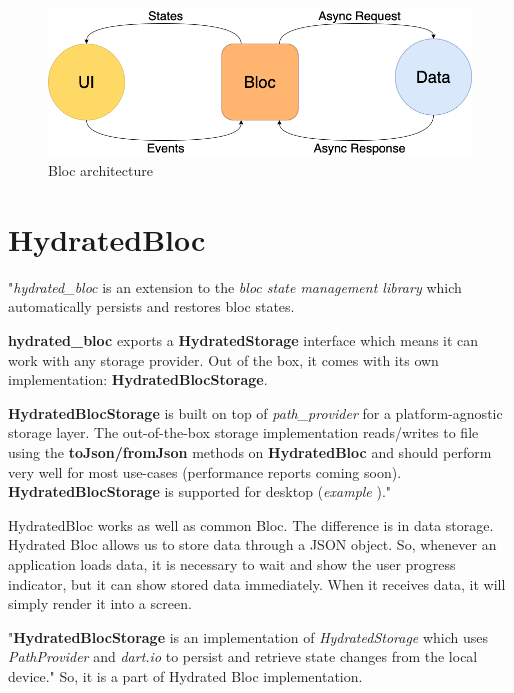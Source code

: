 \begin{figure}
    \centering
    \includegraphics[scale=0.4]{assets/bloc_architecture.png}
    \caption{Bloc architecture\cite{bloc}}
    \label{fig:bloc-architecture}
\end{figure}

\section{HydratedBloc}\label{subsec:hydratedbloc}
"\textit{hydrated\_bloc} \cite{hydratedBlocPubDev} is an extension to the \textit{bloc state management library} \cite{bloc} which automatically persists and restores bloc states.

\textbf{hydrated\_bloc} exports a \textbf{HydratedStorage} interface which means it can work with any storage provider.
Out of the box, it comes with its own implementation: \textbf{HydratedBlocStorage}.

\textbf{HydratedBlocStorage} is built on top of \textit{path\_provider} \cite{pathProvider} for a platform-agnostic storage layer.
The out-of-the-box storage implementation reads/writes to file using the \textbf{toJson/fromJson} methods on \textbf{HydratedBloc} and should perform very well for most use-cases (performance reports coming soon).
\textbf{HydratedBlocStorage} is supported for desktop (\textit{example} \cite{hydratedBlocExample})."\cite{hydratedBlocTut}

HydratedBloc works as well as common Bloc.
The difference is in data storage.
Hydrated Bloc allows us to store data through a JSON object.
So, whenever an application loads data, it is necessary to wait and show the user progress indicator, but it can show stored data immediately.
When it receives data, it will simply render it into a screen.

"\textbf{HydratedBlocStorage} is an implementation of \textit{HydratedStorage} which uses \textit{PathProvider} and \textit{dart.io} to persist and retrieve state changes from the local device."\cite{hydratedBlocStorage}
So, it is a part of Hydrated Bloc implementation.